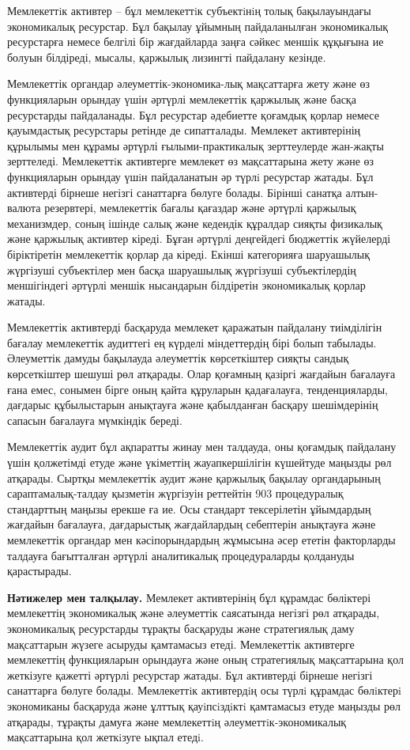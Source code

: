 \begin{multicols}{2}
Мемлекеттiк активтер -- бұл мемлекеттiк субъектiнiң толық бақылауындағы
экономикалық ресурстар. Бұл бақылау ұйымның пайдаланылған экономикалық
ресурстарға немесе белгілі бір жағдайларда заңға сәйкес меншік құқығына
ие болуын білдіреді, мысалы, қаржылық лизингті пайдалану кезінде.

Мемлекеттік органдар әлеуметтік-экономика-лық мақсаттарға жету және өз
функцияларын орындау үшін әртүрлі мемлекеттік қаржылық және басқа
ресурстарды пайдаланады. Бұл ресурстар әдебиетте қоғамдық қорлар немесе
қауымдастық ресурстары ретінде де сипатталады. Мемлекет активтерінің
құрылымы мен құрамы әртүрлі ғылыми-практикалық зерттеулерде жан-жақты
зерттеледі. Мемлекеттiк активтерге мемлекет өз мақсаттарына жету және өз
функцияларын орындау үшiн пайдаланатын әр түрлi ресурстар жатады. Бұл
активтерді бірнеше негізгі санаттарға бөлуге болады. Бірінші санатқа
алтын-валюта резервтері, мемлекеттік бағалы қағаздар және әртүрлі
қаржылық механизмдер, соның ішінде салық және кедендік құралдар сияқты
физикалық және қаржылық активтер кіреді. Бұған әртүрлі деңгейдегі
бюджеттік жүйелерді біріктіретін мемлекеттік қорлар да кіреді. Екінші
категорияға шаруашылық жүргізуші субъектілер мен басқа шаруашылық
жүргізуші субъектілердің меншігіндегі әртүрлі меншік нысандарын
білдіретін экономикалық қорлар жатады.

Мемлекеттік активтерді басқаруда мемлекет қаражатын пайдалану
тиімділігін бағалау мемлекеттік аудиттегі ең күрделі міндеттердің бірі
болып табылады. Әлеуметтік дамуды бақылауда әлеуметтік көрсеткіштер
сияқты сандық көрсеткіштер шешуші рөл атқарады. Олар қоғамның қазіргі
жағдайын бағалауға ғана емес, сонымен бірге оның қайта құруларын
қадағалауға, тенденцияларды, дағдарыс құбылыстарын анықтауға және
қабылданған басқару шешімдерінің сапасын бағалауға мүмкіндік береді.

Мемлекеттік аудит бұл ақпаратты жинау мен талдауда, оны қоғамдық
пайдалану үшін қолжетімді етуде және үкіметтің жауапкершілігін күшейтуде
маңызды рөл атқарады. Сыртқы мемлекеттік аудит және қаржылық бақылау
органдарының сараптамалық-талдау қызметін жүргізуін реттейтін 903
процедуралық стандарттың маңызы ерекше ға ие. Осы стандарт тексерілетін
ұйымдардың жағдайын бағалауға, дағдарыстық жағдайлардың себептерін
анықтауға және мемлекеттік органдар мен кәсіпорындардың жұмысына әсер
ететін факторларды талдауға бағытталған әртүрлі аналитикалық
процедураларды қолдануды қарастырады.

{\bfseries Нәтижелер мен талқылау.} Мемлекет активтерінің бұл құрамдас
бөліктері мемлекеттің экономикалық және әлеуметтік саясатында негізгі
рөл атқарады, экономикалық ресурстарды тұрақты басқаруды және
стратегиялық даму мақсаттарын жүзеге асыруды қамтамасыз етеді.
Мемлекеттік активтерге мемлекеттің функцияларын орындауға және оның
стратегиялық мақсаттарына қол жеткізуге қажетті әртүрлі ресурстар
жатады. Бұл активтерді бірнеше негізгі санаттарға бөлуге болады.
Мемлекеттiк активтердiң осы түрлi құрамдас бөлiктерi экономиканы
басқаруда және ұлттық қауiпсiздiктi қамтамасыз етуде маңызды рөл
атқарады, тұрақты дамуға және мемлекеттiң әлеуметтiк-экономикалық
мақсаттарына қол жеткiзуге ықпал етедi.
\end{multicols}

